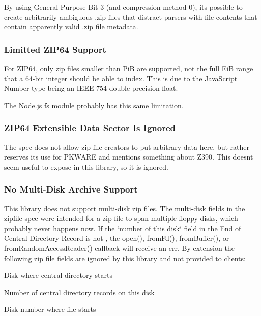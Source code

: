 By using General Purpose Bit 3 (and compression method 0), it\textquotesingle{}s possible to create arbitrarily ambiguous .zip files that distract parsers with file contents that contain apparently valid .zip file metadata.

\subsubsection*{Limitted Z\+I\+P64 Support}

For Z\+I\+P64, only zip files smaller than {\+PiB} are supported, not the full {\+EiB} range that a 64-\/bit integer should be able to index. This is due to the Java\+Script Number type being an I\+E\+EE 754 double precision float.

The Node.\+js {\ttfamily fs} module probably has this same limitation.

\subsubsection*{Z\+I\+P64 Extensible Data Sector Is Ignored}

The spec does not allow zip file creators to put arbitrary data here, but rather reserves its use for P\+K\+W\+A\+RE and mentions something about Z390. This doesn\textquotesingle{}t seem useful to expose in this library, so it is ignored.

\subsubsection*{No Multi-\/\+Disk Archive Support}

This library does not support multi-\/disk zip files. The multi-\/disk fields in the zipfile spec were intended for a zip file to span multiple floppy disks, which probably never happens now. If the \char`\"{}number of this disk\char`\"{} field in the End of Central Directory Record is not {}, the {\ttfamily open()}, {\ttfamily from\+Fd()}, {\ttfamily from\+Buffer()}, or {\ttfamily from\+Random\+Access\+Reader()} {\ttfamily callback} will receive an {\ttfamily err}. By extension the following zip file fields are ignored by this library and not provided to clients\+:


\begin{DoxyItemize}
\item Disk where central directory starts
\item Number of central directory records on this disk
\item Disk number where file starts
\end{DoxyItemize}

